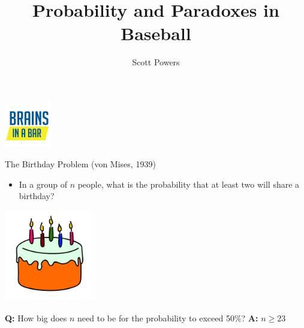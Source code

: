 \documentclass[handout]{beamer}
\title{Probability and Paradoxes in Baseball}
\author{Scott Powers}
\date{}
\begin{document}
  \begin{frame}
    \maketitle
    \begin{center}
      \includegraphics[width = 2cm]{images/brains_in_a_bar.png}
    \end{center}
  \end{frame}

  \begin{frame}{The Birthday Problem (von Mises, 1939)}
    \begin{itemize}
      \item In a group of $n$ people, what is the probability that at least two will share a birthday?
    \end{itemize}
    \begin{center}
      \includegraphics[width = 4cm]{images/birthday_cake.jpg}
    \end{center}
    {\bf Q:} How big does $n$ need to be for the probability to exceed 50\%?
    \pause
    {\bf A:} $n \ge 23$
  \end{frame}
\end{document}
